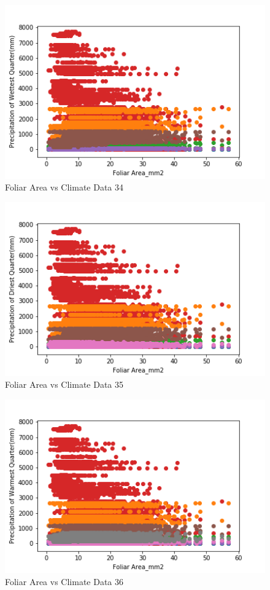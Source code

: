\documentclass[letterpaper]{article}
\begin{document}
\begin{figure}[h]
\caption{Foliar Area vs Climate Data 34\label{fig:Foliar_Area_vs_34}}
\centering
\includegraphics[width=0.7\paperwidth]{Foliar_Area_vs_34}
\end{figure}


\begin{figure}[h]
\caption{Foliar Area vs Climate Data 35\label{fig:Foliar_Area_vs_35}}
\centering
\includegraphics[width=0.7\paperwidth]{Foliar_Area_vs_35}
\end{figure}


\begin{figure}[h]
\caption{Foliar Area vs Climate Data 36\label{fig:Foliar_Area_vs_36}}
\centering
\includegraphics[width=0.7\paperwidth]{Foliar_Area_vs_36}
\end{figure}
\end{document}
